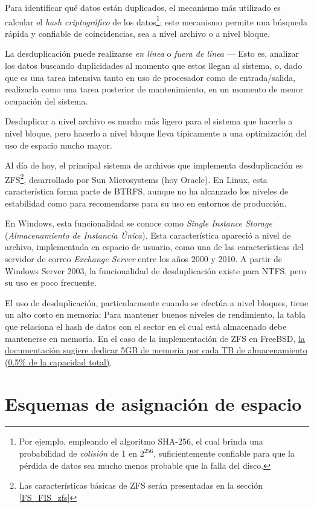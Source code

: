\documentclass[11pt,fleqn]{book} %
\begin{document}
Para identificar qué datos están duplicados, el mecanismo más
utilizado es calcular el \emph{hash criptográfico} de los datos\footnote{Por
ejemplo, empleando el algoritmo SHA-256, el cual brinda una
probabilidad de \emph{colisión} de 1 en $2^{256}$, suficientemente
confiable para que la pérdida de datos sea mucho menos probable que la
falla del disco. }; este mecanismo permite una búsqueda rápida y
confiable de coincidencias, sea a nivel archivo o a nivel bloque.

La desduplicación puede realizarse \emph{en línea} o \emph{fuera de línea} —
Esto es, analizar los datos buscando duplicidades al momento que estos
llegan al sistema, o, dado que es una tarea intensiva tanto en uso de
procesador como de entrada/salida, realizarla como una tarea posterior
de mantenimiento, en un momento de menor ocupación del sistema.

Desduplicar a nivel archivo es mucho más ligero para el sistema que
hacerlo a nivel bloque, pero hacerlo a nivel bloque lleva típicamente
a una optimización del uso de espacio mucho mayor.

Al día de hoy, el principal sistema de archivos que implementa
desduplicación es ZFS\footnote{Las características básicas de ZFS serán
presentadas en la sección \ref{FS_FIS_zfs} }, desarrollado por Sun
Microsystems (hoy Oracle). En Linux, esta característica forma parte
de BTRFS, aunque no ha alcanzado los niveles de estabilidad como para
recomendarse para su uso en entornos de producción.

En Windows, esta funcionalidad se conoce como \emph{Single Instance Storage} (\emph{Almacenamiento de Instancia Única}). Esta característica
apareció a nivel de archivo, implementada en espacio de usuario, como
una de las características del servidor de correo \emph{Exchange Server}
entre los años 2000 y 2010. A partir de Windows Server 2003, la
funcionalidad de desduplicación existe para NTFS, pero su uso es poco
frecuente.

El uso de desduplicación, particularmente cuando se efectúa a nivel
bloques, tiene un alto costo en memoria: Para mantener buenos niveles
de rendimiento, la tabla que relaciona el hash de datos con el sector
en el cual está almacenado debe mantenerse en memoria. En el caso de
la implementación de ZFS en FreeBSD, \href{http://www.freebsd.org/doc/en_US.ISO8859-1/books/handbook/filesystems-zfs.html}{la documentación sugiere dedicar 5GB de memoria por cada TB de almacenamiento (0.5\% de la capacidad total)}.
\section{Esquemas de asignación de espacio}
\label{sec-7-2}
\end{document}
